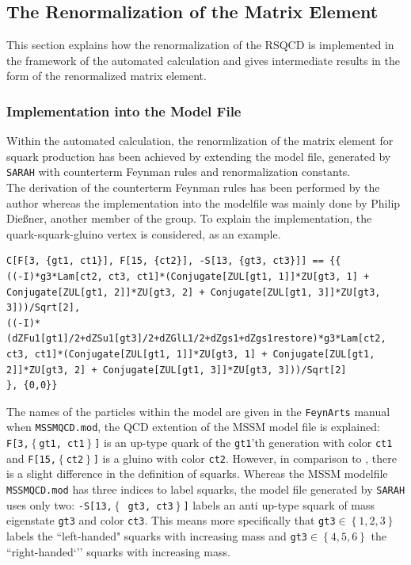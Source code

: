\subsection{The Renormalization of the Matrix Element}
This section explains how the renormalization of the RSQCD is implemented in the framework of the automated calculation and gives intermediate results in the form of the renormalized matrix element.

\subsubsection{Implementation into the Model File}
Within the automated calculation, the renormlization of the matrix element for squark production has been achieved by extending the model file, generated by \texttt{SARAH} with counterterm Feynman rules and renormalization constants.\\ 
The derivation of the counterterm Feynman rules has been performed by the author whereas the implementation into the modelfile was mainly done by Philip Dießner, another member of the group. To explain the implementation, the quark-squark-gluino vertex is considered, as an example.
\begin{lstlisting}[style=MyMathematica]
C[F[3, {gt1, ct1}], F[15, {ct2}], -S[13, {gt3, ct3}]] == {{
((-I)*g3*Lam[ct2, ct3, ct1]*(Conjugate[ZUL[gt1, 1]]*ZU[gt3, 1] + Conjugate[ZUL[gt1, 2]]*ZU[gt3, 2] + Conjugate[ZUL[gt1, 3]]*ZU[gt3, 3]))/Sqrt[2],
((-I)*(dZFu1[gt1]/2+dZSu1[gt3]/2+dZGlL1/2+dZgs1+dZgs1restore)*g3*Lam[ct2, ct3, ct1]*(Conjugate[ZUL[gt1, 1]]*ZU[gt3, 1] + Conjugate[ZUL[gt1, 2]]*ZU[gt3, 2] + Conjugate[ZUL[gt1, 3]]*ZU[gt3, 3]))/Sqrt[2]
}, {0,0}}
\end{lstlisting}
The names of the particles within the model are given in the \texttt{FeynArts} manual\cite{FeynArtsManual} when  \texttt{MSSMQCD.mod}, the QCD extention of the MSSM model file is explained:\\ 
\mbox{\texttt{F[3,$\left\{ \right.$gt1, ct1$\left.\right\}$]}} is an up-type quark of the \texttt{gt1}'th generation with color \texttt{ct1} and \texttt{F[15,$\left\{ \right.$ct2$\left.\right\}$]} is a gluino with color \texttt{ct2}. However, in comparison to \cite{FeynArtsManual}, there is a slight difference in the definition of squarks. Whereas the MSSM modelfile \texttt{MSSMQCD.mod} has three indices to label squarks, the model file generated by \texttt{SARAH} uses only two: \texttt{-S[13,$\left\{ \right.$ gt3, ct3$\left.\right\}$]} labels an anti up-type squark of mass eigenstate \texttt{gt3} and color \texttt{ct3}. This means more specifically that \texttt{gt3}$\in \left\{ 1,2,3 \right\}$ labels the ``left-handed" squarks with increasing mass and \texttt{gt3}$\in \left\{ 4,5,6 \right\}$ the ``right-handed`'' squarks with increasing mass.\\
